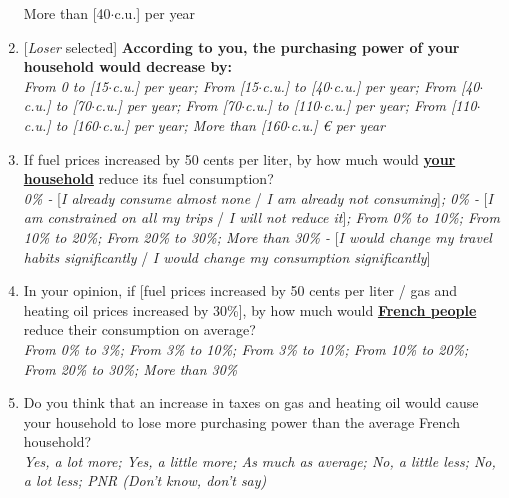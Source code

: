 \documentclass[12pt]{article} %
\begin{document}
\begin{appendices}
\begin{enumerate}[resume,leftmargin=*]
{More than {[}40$\cdot$c.u.{]} \euros{} per year}
\item {[}\emph{Loser} selected{]} \textbf{According to you, the purchasing
power of your household would decrease by:} \emph{}\\
\emph{From 0 to {[}15$\cdot$c.u.{]} \euros{} per year; From {[}15$\cdot$c.u.{]}
to {[}40$\cdot$c.u.{]} \euros{} per year; From {[}40$\cdot$c.u.{]} to {[}70$\cdot$c.u.{]}
\euros{} per year; From {[}70$\cdot$c.u.{]} to {[}110$\cdot$c.u.{]} \euros{} per year;
From {[}110$\cdot$c.u.{]} to {[}160$\cdot$c.u.{]} \euros{} per year; More
than {[}160$\cdot$c.u.{]} \euro{} per year}
\item If fuel prices increased by 50 cents per liter, by how much would
\textbf{\underline{your household}} reduce its fuel consumption? \emph{}\\
\emph{0\% -} {[}\emph{I already consume almost none }/\emph{ I am
already not consuming}{]}\emph{; 0\% - }{[}\emph{I am constrained
on all my trips} / \emph{I will not reduce it}{]}\emph{; From 0\%
to 10\%; From 10\% to 20\%; From 20\% to 30\%; More than 30\% - }{[}\emph{I
would change my travel habits significantly }/ \emph{I would change
my consumption significantly}{]}
\item In your opinion, if {[}fuel prices increased by 50 cents per liter
/ gas and heating oil prices increased by 30\%{]}, by how much would
\textbf{\underline{French people}} reduce their consumption on average?
\emph{}\\
\emph{From 0\% to 3\%; From 3\% to 10\%; From 3\% to 10\%; From 10\%
to 20\%; From 20\% to 30\%; More than 30\%} 
\item Do you think that an increase in taxes on gas and heating oil would cause your household to lose more purchasing power than the average French household?\\
\emph{Yes, a lot more; Yes, a little more; As much as average; No, a little less; No, a lot less; PNR (Don't know, don't say)} %
\end{enumerate}


\end{appendices}
\end{document}
